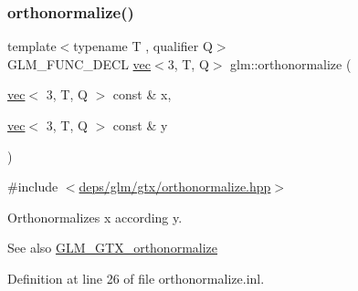 \subsubsection{\texorpdfstring{orthonormalize()}{orthonormalize()}\hspace{0.1cm}{\footnotesize\ttfamily [2/2]}}
{\footnotesize\ttfamily template$<$typename T , qualifier Q$>$ \\
G\+L\+M\+\_\+\+F\+U\+N\+C\+\_\+\+D\+E\+CL \hyperlink{structglm_1_1vec}{vec}$<$3, T, Q$>$ glm\+::orthonormalize (\begin{DoxyParamCaption}\item[{\hyperlink{structglm_1_1vec}{vec}$<$ 3, T, Q $>$ const \&}]{x,  }\item[{\hyperlink{structglm_1_1vec}{vec}$<$ 3, T, Q $>$ const \&}]{y }\end{DoxyParamCaption})}



{\ttfamily \#include $<$\hyperlink{orthonormalize_8hpp}{deps/glm/gtx/orthonormalize.\+hpp}$>$}

Orthonormalizes x according y.

\begin{DoxySeeAlso}{See also}
\hyperlink{group__gtx__orthonormalize}{G\+L\+M\+\_\+\+G\+T\+X\+\_\+orthonormalize} 
\end{DoxySeeAlso}


Definition at line 26 of file orthonormalize.\+inl.

